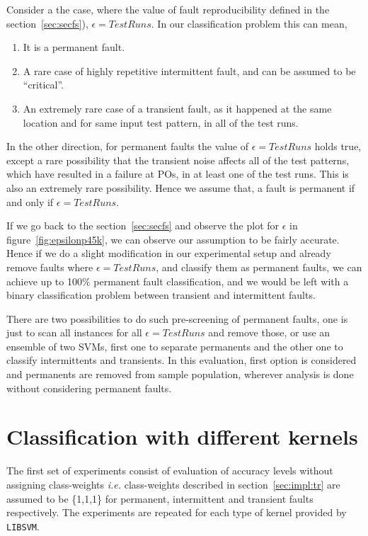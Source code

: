 Consider a the case, where the value of fault reproducibility defined in the section~\ref{sec:secfs}), $\epsilon = Test Runs$. In our classification problem this can mean,
\begin{enumerate}
  \item It is a permanent fault.
  \item A rare case of highly repetitive intermittent fault, and can be assumed to be \enquote{critical}.
  \item An extremely rare case of a transient fault, as it happened at the same location and for same input test pattern, in all of the test runs.
\end{enumerate}

In the other direction, for permanent faults the value of $\epsilon = Test Runs$ holds true, except a rare possibility that the transient noise affects all of the test patterns, which have resulted in a failure at POs, in at least one of the test runs. This is also an extremely rare possibility. Hence we assume that, a fault is permanent if and only if $\epsilon = Test Runs$.

If we go back to the section~\ref{sec:secfs} and observe the plot for $\epsilon$ in figure~\ref{fig:epsilonp45k}, we can observe our assumption to be fairly accurate. Hence if we do a slight modification in our experimental setup and already remove faults where $\epsilon = Test Runs$, and classify them as permanent faults, we can achieve up to 100\% permanent fault classification, and we would be left with a binary classification problem between transient and intermittent faults.

There are two possibilities to do such pre-screening of permanent faults, one is just to scan all instances for all $\epsilon = Test Runs$ and remove those, or use an ensemble of two SVMs, first one to separate permanents and the other one to classify intermittents and transients. In this evaluation, first option is considered and permanents are removed from sample population, wherever analysis is done without considering permanent faults.

\section{Classification with different kernels}
The first set of experiments consist of evaluation of accuracy levels without assigning class-weights \emph{i.e.} class-weights described in section~\ref{sec:impl:tr} are assumed to be \{1,1,1\} for permanent, intermittent and transient faults respectively. The experiments are repeated for each type of kernel provided by \texttt{LIBSVM}.

